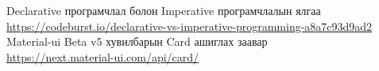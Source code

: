 
\singlespace
{}
\begin{thebibliography}{99}
	Declarative програмчлал болон Imperative програмчлалын ялгаа
	\\\url{https://codeburst.io/declarative-vs-imperative-programming-a8a7c93d9ad2}
	Material-ui Beta v5 хувилбарын Card ашиглах заавар
	\\\url{https://next.material-ui.com/api/card/}
\end{thebibliography}
